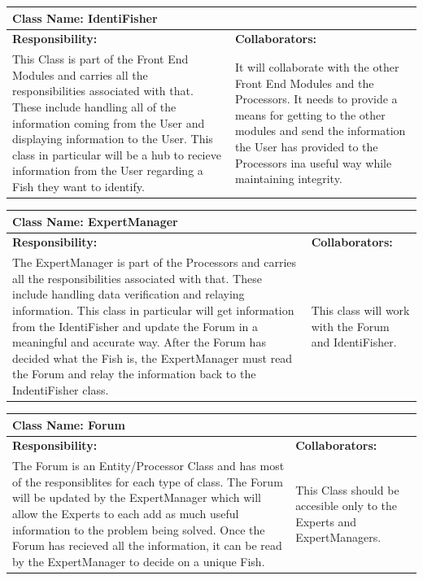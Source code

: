 \documentclass[]{article}
\begin{document}
	\begin{table}[ht]
		\centering
		\begin{tabular}{|p{5cm}|p{5cm}|}
		\hline
		 \multicolumn{2}{|l|}{\textbf{Class Name: IdentiFisher}} \\
		\hline
		\textbf{Responsibility:} & \textbf{Collaborators:} \\ \hline
		This Class is part of the Front End Modules and carries all the responsibilities associated with that. These include handling all of the information coming from the User and displaying information to the User. This class in particular will be a hub to recieve information from the User regarding a Fish they want to identify. & It will collaborate with the other Front End Modules and the Processors. It needs to provide a means for getting to the other modules and send the information the User has provided to the Processors ina useful way while maintaining integrity. \\
		\hline
		\end{tabular}
	\end{table}

	\begin{table}[ht]
		\centering
		\begin{tabular}{|p{5cm}|p{5cm}|}
		\hline
		 \multicolumn{2}{|l|}{\textbf{Class Name: ExpertManager}} \\
		\hline
		\textbf{Responsibility:} & \textbf{Collaborators:} \\ \hline
		The ExpertManager is part of the Processors and carries all the responsibilities associated with that. These include handling data verification and relaying information. This class in particular will get information from the IdentiFisher and update the Forum in a meaningful and accurate way. After the Forum has decided what the Fish is, the ExpertManager must read the Forum and relay the information back to the IndentiFisher class. & This class will work with the Forum and IdentiFisher.\\
		\hline
		\end{tabular}
	\end{table}

	\begin{table}[ht]
		\centering
		\begin{tabular}{|p{5cm}|p{5cm}|}
		\hline
		 \multicolumn{2}{|l|}{\textbf{Class Name: Forum}} \\
		\hline
		\textbf{Responsibility:} & \textbf{Collaborators:} \\ \hline
		The Forum is an Entity/Processor Class and has most of the responsiblites for each type of class. The Forum will be updated by the ExpertManager which will allow the Experts to each add as much useful information to the problem being solved. Once the Forum has recieved all the information, it can be read by the ExpertManager to decide on a unique Fish. & This Class should be accesible only to the Experts and ExpertManagers. \\
		\hline
		\end{tabular}
	\end{table}
\end{document}
